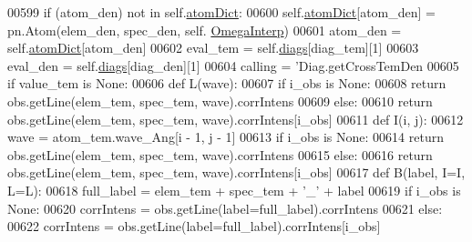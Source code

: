 \begin{DoxyCode}
{{{00599         \textcolor{keywordflow}{if} (atom\_den) \textcolor{keywordflow}{not} \textcolor{keywordflow}{in} self.\hyperlink{classpyneb_1_1core_1_1diags_1_1_diagnostics_a36301f268745b33abe6cfeb3e41a6356}{atomDict}:
00600             self.\hyperlink{classpyneb_1_1core_1_1diags_1_1_diagnostics_a36301f268745b33abe6cfeb3e41a6356}{atomDict}[atom\_den] = pn.Atom(elem\_den, spec\_den, self.
      \hyperlink{classpyneb_1_1core_1_1diags_1_1_diagnostics_acfd0638b293790832bcee3cd9f3ec342}{OmegaInterp})
00601         atom\_den = self.\hyperlink{classpyneb_1_1core_1_1diags_1_1_diagnostics_a36301f268745b33abe6cfeb3e41a6356}{atomDict}[atom\_den]
00602         eval\_tem = self.\hyperlink{classpyneb_1_1core_1_1diags_1_1_diagnostics_a0c0f7e36097677f61a6a14a0c3127b02}{diags}[diag\_tem][1]
00603         eval\_den = self.\hyperlink{classpyneb_1_1core_1_1diags_1_1_diagnostics_a0c0f7e36097677f61a6a14a0c3127b02}{diags}[diag\_den][1]
00604         calling = \textcolor{stringliteral}{'Diag.getCrossTemDen %
00605         \textcolor{keywordflow}{if} value\_tem \textcolor{keywordflow}{is} \textcolor{keywordtype}{None}:
00606             \textcolor{keyword}{def }L(wave):
00607                 \textcolor{keywordflow}{if} i\_obs \textcolor{keywordflow}{is} \textcolor{keywordtype}{None}:
00608                     \textcolor{keywordflow}{return} obs.getLine(elem\_tem, spec\_tem, wave).corrIntens
00609                 \textcolor{keywordflow}{else}:
00610                     \textcolor{keywordflow}{return} obs.getLine(elem\_tem, spec\_tem, wave).corrIntens[i\_obs]
00611             \textcolor{keyword}{def }I(i, j):
00612                 wave = atom\_tem.wave\_Ang[i - 1, j - 1]
00613                 \textcolor{keywordflow}{if} i\_obs \textcolor{keywordflow}{is} \textcolor{keywordtype}{None}:
00614                     \textcolor{keywordflow}{return} obs.getLine(elem\_tem, spec\_tem, wave).corrIntens
00615                 \textcolor{keywordflow}{else}:
00616                     \textcolor{keywordflow}{return} obs.getLine(elem\_tem, spec\_tem, wave).corrIntens[i\_obs]
00617             \textcolor{keyword}{def }B(label, I=I, L=L):
00618                 full\_label = elem\_tem + spec\_tem + \textcolor{stringliteral}{'\_'} + label
00619                 \textcolor{keywordflow}{if} i\_obs \textcolor{keywordflow}{is} \textcolor{keywordtype}{None}:
00620                     corrIntens = obs.getLine(label=full\_label).corrIntens
00621                 \textcolor{keywordflow}{else}:
00622                     corrIntens = obs.getLine(label=full\_label).corrIntens[i\_obs]
}}}}
\end{DoxyCode}
